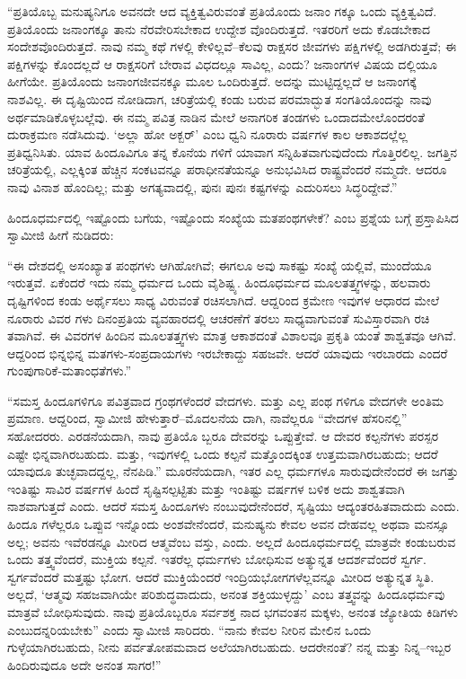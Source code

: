 “ಪ್ರತಿಯೊಬ್ಬ ಮನುಷ್ಯನಿಗೂ ಅವನದೇ ಆದ ವ್ಯಕ್ತಿತ್ವವಿರುವಂತೆ ಪ್ರತಿಯೊಂದು ಜನಾಂ ಗಕ್ಕೂ ಒಂದು ವ್ಯಕ್ತಿತ್ವವಿದೆ. ಪ್ರತಿಯೊಂದು ಜನಾಂಗಕ್ಕೂ ತಾನು ನೆರವೇರಿಸಬೇಕಾದ ಉದ್ದೇಶ ವೊಂದಿರುತ್ತದೆ. ಇತರರಿಗೆ ಅದು ಕೊಡಬೇಕಾದ ಸಂದೇಶವೊಂದಿರುತ್ತದೆ. ನಾವು ನಮ್ಮ ಕಥೆ ಗಳಲ್ಲಿ ಕೇಳಿಲ್ಲವೆ–ಕೆಲವು ರಾಕ್ಷಸರ ಜೀವಗಳು ಪಕ್ಷಿಗಳಲ್ಲಿ ಅಡಗಿರುತ್ತವೆ; ಈ ಪಕ್ಷಿಗಳನ್ನು ಕೊಂದಲ್ಲದೆ ಆ ರಾಕ್ಷಸರಿಗೆ ಬೇರಾವ ವಿಧದಲ್ಲೂ ಸಾವಿಲ್ಲ, ಎಂದು? ಜನಾಂಗಗಳ ವಿಷಯ ದಲ್ಲಿಯೂ ಹೀಗೆಯೇ. ಪ್ರತಿಯೊಂದು ಜನಾಂಗಜೀವನಕ್ಕೂ ಮೂಲ ಒಂದಿರುತ್ತದೆ. ಅದನ್ನು ಮುಟ್ಟಿದ್ದಲ್ಲದೆ ಆ ಜನಾಂಗಕ್ಕೆ ನಾಶವಿಲ್ಲ. ಈ ದೃಷ್ಟಿಯಿಂದ ನೋಡಿದಾಗ, ಚರಿತ್ರೆಯಲ್ಲಿ ಕಂಡು ಬರುವ ಪರಮಾದ್ಭುತ ಸಂಗತಿಯೊಂದನ್ನು ನಾವು ಅರ್ಥಮಾಡಿಕೊಳ್ಳಬಲ್ಲೆವು. ಈ ನಮ್ಮ ಪವಿತ್ರ ನಾಡಿನ ಮೇಲೆ ಅನಾಗರಿಕ ತಂಡಗಳು ಒಂದಾದಮೇಲೊಂದರಂತೆ ದುರಾಕ್ರಮಣ ನಡೆಸಿದುವು. ‘ಅಲ್ಲಾ ಹೋ ಅಕ್ಬರ್​’ ಎಂಬ ಧ್ವನಿ ನೂರಾರು ವರ್ಷಗಳ ಕಾಲ ಆಕಾಶದಲ್ಲೆಲ್ಲ ಪ್ರತಿಧ್ವನಿಸಿತು. ಯಾವ ಹಿಂದೂವಿಗೂ ತನ್ನ ಕೊನೆಯ ಗಳಿಗೆ ಯಾವಾಗ ಸನ್ನಿಹಿತವಾಗುವುದೆಂದು ಗೊತ್ತಿರಲಿಲ್ಲ. ಜಗತ್ತಿನ ಚರಿತ್ರೆಯಲ್ಲಿ, ಎಲ್ಲಕ್ಕಿಂತ ಹೆಚ್ಚಿನ ಸಂಕಟವನ್ನೂ ಪರಾಧೀನತೆಯನ್ನೂ ಅನುಭವಿಸಿದ ರಾಷ್ಟ್ರವೆಂದರೆ ನಮ್ಮದೇ. ಆದರೂ ನಾವು ವಿನಾಶ ಹೊಂದಿಲ್ಲ; ಮತ್ತು ಅಗತ್ಯವಾದಲ್ಲಿ, ಪುನಃ ಪುನಃ ಕಷ್ಟಗಳನ್ನು ಎದುರಿಸಲು ಸಿದ್ಧರಿದ್ದೇವೆ.”

 ಹಿಂದೂಧರ್ಮದಲ್ಲಿ ಇಷ್ಟೊಂದು ಬಗೆಯ, ಇಷ್ಟೊಂದು ಸಂಖ್ಯೆಯ ಮತಪಂಥಗಳೇಕೆ? ಎಂಬ ಪ್ರಶ್ನೆಯ ಬಗ್ಗೆ ಪ್ರಸ್ತಾಪಿಸಿದ ಸ್ವಾಮೀಜಿ ಹೀಗೆ ನುಡಿದರು:

“ಈ ದೇಶದಲ್ಲಿ ಅಸಂಖ್ಯಾತ ಪಂಥಗಳು ಆಗಿಹೋಗಿವೆ; ಈಗಲೂ ಅವು ಸಾಕಷ್ಟು ಸಂಖ್ಯೆ ಯಲ್ಲಿವೆ, ಮುಂದೆಯೂ ಇರುತ್ತವೆ. ಏಕೆಂದರೆ ಇದು ನಮ್ಮ ಧರ್ಮದ ಒಂದು ವೈಶಿಷ್ಟ್ಯ. ಹಿಂದೂಧರ್ಮದ ಮೂಲತತ್ತ್ವಗಳನ್ನು, ಹಲವಾರು ದೃಷ್ಟಿಗಳಿಂದ ಕಂಡು ಅರ್ಥೈಸಲು ಸಾಧ್ಯ ವಿರುವಂತೆ ರಚಿಸಲಾಗಿದೆ. ಆದ್ದರಿಂದ ಕ್ರಮೇಣ ಇವುಗಳ ಆಧಾರದ ಮೇಲೆ ನೂರಾರು ವಿವರ ಗಳು ದಿನಂಪ್ರತಿಯ ವ್ಯವಹಾರದಲ್ಲಿ ಆಚರಣೆಗೆ ತರಲು ಸಾಧ್ಯವಾಗುವಂತೆ ಸುವಿಸ್ತಾರವಾಗಿ ರಚಿ ತವಾಗಿವೆ. ಈ ವಿವರಗಳ ಹಿಂದಿನ ಮೂಲತತ್ತ್ವಗಳು ಮಾತ್ರ ಆಕಾಶದಂತೆ ವಿಶಾಲವೂ ಪ್ರಕೃತಿ ಯಂತೆ ಶಾಶ್ವತವೂ ಆಗಿವೆ. ಆದ್ದರಿಂದ ಭಿನ್ನಭಿನ್ನ ಮತಗಳು-ಸಂಪ್ರದಾಯಗಳು ಇರಬೇಕಾದ್ದು ಸಹಜವೇ. ಆದರೆ ಯಾವುದು ಇರಬಾರದು ಎಂದರೆ ಗುಂಪುಗಾರಿಕೆ-ಮತಾಂಧತೆಗಳು.”

“ಸಮಸ್ತ ಹಿಂದೂಗಳಿಗೂ ಪವಿತ್ರವಾದ ಗ್ರಂಥಗಳೆಂದರೆ ವೇದಗಳು. ಮತ್ತು ಎಲ್ಲ ಪಂಥ ಗಳಿಗೂ ವೇದಗಳೇ ಅಂತಿಮ ಪ್ರಮಾಣ. ಆದ್ದರಿಂದ, ಸ್ವಾಮೀಜಿ ಹೇಳುತ್ತಾರೆ–ಮೊದಲನೆಯ ದಾಗಿ, ನಾವೆಲ್ಲರೂ “ವೇದಗಳ ಹೆಸರಿನಲ್ಲಿ” ಸಹೋದರರು. ಎರಡನೆಯದಾಗಿ, ನಾವು ಪ್ರತಿಯೊ ಬ್ಬರೂ ದೇವರನ್ನು ಒಪ್ಪುತ್ತೇವೆ. ಆ ದೇವರ ಕಲ್ಪನೆಗಳು ಪರಸ್ಪರ ಎಷ್ಟೇ ಭಿನ್ನವಾಗಿರಬಹುದು. ಮತ್ತು, ಇವುಗಳಲ್ಲಿ ಒಂದು ಕಲ್ಪನೆ ಮತ್ತೊಂದಕ್ಕಿಂತ ಉತ್ತಮವಾಗಿರಬಹುದು; ಆದರೆ ಯಾವುದೂ ತುಚ್ಛವಾದದ್ದಲ್ಲ, ನೆನಪಿಡಿ.” ಮೂರನೆಯದಾಗಿ, ಇತರ ಎಲ್ಲ ಧರ್ಮಗಳೂ ಸಾರುವುದೇನೆಂದರೆ ಈ ಜಗತ್ತು ಇಂತಿಷ್ಟು ಸಾವಿರ ವರ್ಷಗಳ ಹಿಂದೆ ಸೃಷ್ಟಿಸಲ್ಪಟ್ಟಿತು ಮತ್ತು ಇಂತಿಷ್ಟು ವರ್ಷಗಳ ಬಳಿಕ ಅದು ಶಾಶ್ವತವಾಗಿ ನಾಶವಾಗುತ್ತದೆ ಎಂದು. ಆದರೆ ಸಮಸ್ತ ಹಿಂದೂಗಳು ನಂಬುವುದೇನೆಂದರೆ, ಸೃಷ್ಟಿಯು ಆದ್ಯಂತರಹಿತವಾದುದು ಎಂದು. ಹಿಂದೂ ಗಳೆಲ್ಲರೂ ಒಪ್ಪುವ ಇನ್ನೊಂದು ಅಂಶವೇನೆಂದರೆ, ಮನುಷ್ಯನು ಕೇವಲ ಅವನ ದೇಹವಲ್ಲ ಅಥವಾ ಮನಸ್ಸೂ ಅಲ್ಲ; ಅವನು ಇವೆರಡನ್ನೂ ಮೀರಿದ ಆತ್ಮವೆಂಬ ವಸ್ತು, ಎಂದು. ಅಲ್ಲದೆ ಹಿಂದೂಧರ್ಮದಲ್ಲಿ ಮಾತ್ರವೇ ಕಂಡುಬರುವ ಒಂದು ತತ್ತ್ವವೆಂದರೆ, ಮುಕ್ತಿಯ ಕಲ್ಪನೆ. ಇತರೆಲ್ಲ ಧರ್ಮಗಳು ಬೋಧಿಸುವ ಅತ್ಯುನ್ನತ ಆದರ್ಶವೆಂದರೆ ಸ್ವರ್ಗ. ಸ್ವರ್ಗವೆಂದರೆ ಮತ್ತಷ್ಟು ಭೋಗ. ಆದರೆ ಮುಕ್ತಿಯೆಂದರೆ ಇಂದ್ರಿಯಭೋಗಗಳೆಲ್ಲವನ್ನೂ ಮೀರಿದ ಅತ್ಯುನ್ನತ ಸ್ಥಿತಿ. ಅಲ್ಲದೆ, ‘ಆತ್ಮವು ಸಹಜವಾಗಿಯೇ ಪರಿಶುದ್ಧವಾದುದು, ಅನಂತ ಶಕ್ತಿಯುಳ್ಳದ್ದು’ ಎಂಬ ತತ್ತ್ವವನ್ನು ಹಿಂದೂಧರ್ಮವು ಮಾತ್ರವೆ ಬೋಧಿಸುವುದು. ನಾವು ಪ್ರತಿಯೊಬ್ಬರೂ ಸರ್ವಶಕ್ತ ನಾದ ಭಗವಂತನ ಮಕ್ಕಳು, ಅನಂತ ಜ್ಯೋತಿಯ ಕಿಡಿಗಳು ಎಂಬುದನ್ನರಿಯಬೇಕು” ಎಂದು ಸ್ವಾಮೀಜಿ ಸಾರಿದರು. “ನಾನು ಕೇವಲ ನೀರಿನ ಮೇಲಿನ ಒಂದು ಗುಳ್ಳೆಯಾಗಿರಬಹುದು, ನೀನು ಪರ್ವತೋಪಮವಾದ ಅಲೆಯಾಗಿರಬಹುದು. ಆದರೇನಂತೆ? ನನ್ನ ಮತ್ತು ನಿನ್ನ–ಇಬ್ಬರ ಹಿಂದಿರುವುದೂ ಅದೇ ಅನಂತ ಸಾಗರ!”

